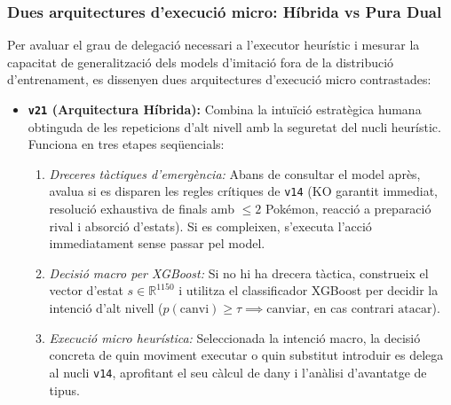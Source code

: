 \subsubsection*{Dues arquitectures d'execució micro: Híbrida vs Pura Dual}

Per avaluar el grau de delegació necessari a l'executor heurístic i mesurar la capacitat de generalització dels models d'imitació fora de la distribució d'entrenament, es dissenyen dues arquitectures d'execució micro contrastades:

\begin{itemize}
    \item \textbf{\texttt{v21} (Arquitectura Híbrida):} Combina la intuïció estratègica humana obtinguda de les repeticions d'alt nivell amb la seguretat del nucli heurístic. Funciona en tres etapes seqüencials:
    \begin{enumerate}
        \item \emph{Dreceres tàctiques d'emergència:} Abans de consultar el model après, avalua si es disparen les regles crítiques de \texttt{v14} (KO garantit immediat, resolució exhaustiva de finals amb $\le 2$ Pokémon, reacció a preparació rival i absorció d'estats). Si es compleixen, s'executa l'acció immediatament sense passar pel model.
        \item \emph{Decisió macro per XGBoost:} Si no hi ha drecera tàctica, construeix el vector d'estat $s \in \mathbb{R}^{1150}$ i utilitza el classificador XGBoost per decidir la intenció d'alt nivell ($p(\text{canvi}) \ge \tau \implies \text{canviar}$, en cas contrari $\text{atacar}$).
        \item \emph{Execució micro heurística:} Seleccionada la intenció macro, la decisió concreta de quin moviment executar o quin substitut introduir es delega al nucli \texttt{v14}, aprofitant el seu càlcul de dany i l'anàlisi d'avantatge de tipus.
    \end{enumerate}


\end{itemize}
